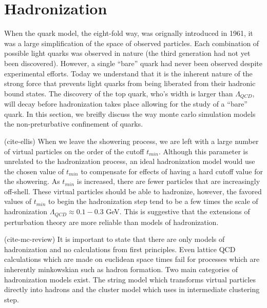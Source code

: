 \section{Hadronization} 

When the quark model, the eight-fold way, was orignally introduced in 1961, it was a large simplification of the space of observed  particles. Each combination of possible light quarks was observed in nature (the third generation had not 
yet been discovered). However, a  single ``bare'' quark had never been observed despite experimental efforts. Today
we understand that it is the inherent nature of the strong force that prevents light quarks from being liberated from their 
hadronic bound states. The discovery of the top quark, who's width is  larger than $\Lambda_{QCD}$, 
will decay before hadronization takes place allowing for the study of a ``bare'' quark. In this section, we breifly discuss
 the way  monte carlo simulation models the non-preturbative confinement of quarks.

(cite-ellis) When we leave the showering process, we are left with a large number of virtual particles on the order of the cutoff $t_{min}$. Although this
parameter is unrelated to the hadronization process, an ideal hadronization model would use the chosen value of $t_{min}$ to compensate for
 effects of having a hard cutoff value for the showering. 
 As $t_{min}$ is increased, there are fewer particles that are increasingly off-shell. These virtual particles should be
 able to hadronize, however, the favored values of $t_{min}$ to begin the hadronization step tend to be a few times the
 scale of hadronization $\Lambda_{QCD} \approx 0.1 - 0.3$ GeV. This is suggestive that the extensions of perturbation theory
 are more reliable than models of hadronization.

(cite-mc-review) It is important to state that there are only models of hadronization and no calculations from first principles. 
Even lattice QCD calculations which are made on euclidean space times fail for processes which are inherently minkowskian 
such as hadron formation. Two main categories of hadronization models exist. The string 
model which transforms virtual particles directly into hadrons and the cluster model which uses in intermediate clustering step. 

